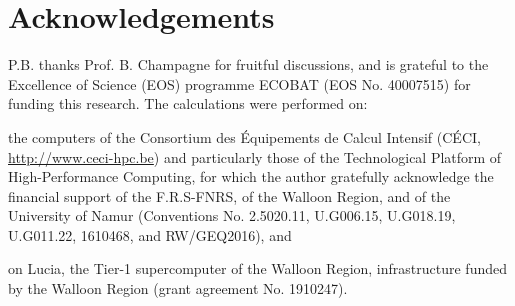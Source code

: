 \documentclass[review,preprint]{elsarticle}
\begin{document}
\section*{Acknowledgements}
P.B. thanks Prof. B. Champagne for fruitful discussions, and is grateful to the Excellence of Science (EOS) programme  ECOBAT (EOS No. 40007515) for funding this research. 
The calculations were performed on: \begin{inparaenum}[(i)]
	\item the computers of the Consortium des \'{E}quipements de Calcul Intensif (C\'{E}CI, \url{http://www.ceci-hpc.be}) and particularly those of the Technological Platform of High-Performance Computing, for which the author gratefully acknowledge the financial support of the F.R.S-FNRS, of the Walloon Region, and of the University of Namur (Conventions No. 2.5020.11, U.G006.15, U.G018.19, U.G011.22, 1610468, and RW/GEQ2016), and
	\item on Lucia, the Tier-1 supercomputer of the Walloon Region, infrastructure funded by the Walloon Region (grant agreement No. 1910247).
\end{inparaenum} 
	
	
 

	
\end{document}
